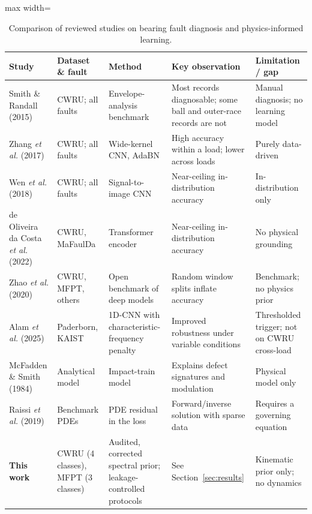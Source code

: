 \documentclass[conference]{IEEEtran}
\begin{document}
\begin{table}[t]
\caption{Comparison of reviewed studies on bearing fault diagnosis and
physics-informed learning.}
\label{tab:related}
\centering
\footnotesize
\begin{adjustbox}{max width=\textwidth}
\begin{tabular}{p{2.5cm} p{2.4cm} p{3.2cm} p{4.0cm} p{3.2cm}}
\toprule
\textbf{Study} & \textbf{Dataset \& fault} & \textbf{Method} & \textbf{Key observation} & \textbf{Limitation / gap} \\
\midrule
Smith \& Randall (2015)~\cite{smith2015} & CWRU; all faults & Envelope-analysis benchmark & Most records diagnosable; some ball and outer-race records are not & Manual diagnosis; no learning model \\
Zhang \emph{et al.} (2017)~\cite{zhang2017} & CWRU; all faults & Wide-kernel CNN, AdaBN & High accuracy within a load; lower across loads & Purely data-driven \\
Wen \emph{et al.} (2018)~\cite{wen2018} & CWRU; all faults & Signal-to-image CNN & Near-ceiling in-distribution accuracy & In-distribution only \\
de Oliveira da Costa \emph{et al.} (2022)~\cite{costa2022} & CWRU, MaFaulDa & Transformer encoder & Near-ceiling in-distribution accuracy & No physical grounding \\
Zhao \emph{et al.} (2020)~\cite{zhao2020} & CWRU, MFPT, others & Open benchmark of deep models & Random window splits inflate accuracy & Benchmark; no physics prior \\
Alam \emph{et al.} (2025)~\cite{alam2025} & Paderborn, KAIST & 1D-CNN with characteristic-frequency penalty & Improved robustness under variable conditions & Thresholded trigger; not on CWRU cross-load \\
McFadden \& Smith (1984)~\cite{mcfadden1984} & Analytical model & Impact-train model & Explains defect signatures and modulation & Physical model only \\
Raissi \emph{et al.} (2019)~\cite{raissi2019} & Benchmark PDEs & PDE residual in the loss & Forward/inverse solution with sparse data & Requires a governing equation \\
\textbf{This work} & CWRU (4 classes), MFPT (3 classes) & Audited, corrected spectral prior; leakage-controlled protocols & See Section~\ref{sec:results} & Kinematic prior only; no dynamics \\
\bottomrule
\end{tabular}
\end{adjustbox}
\end{table}
\end{document}
